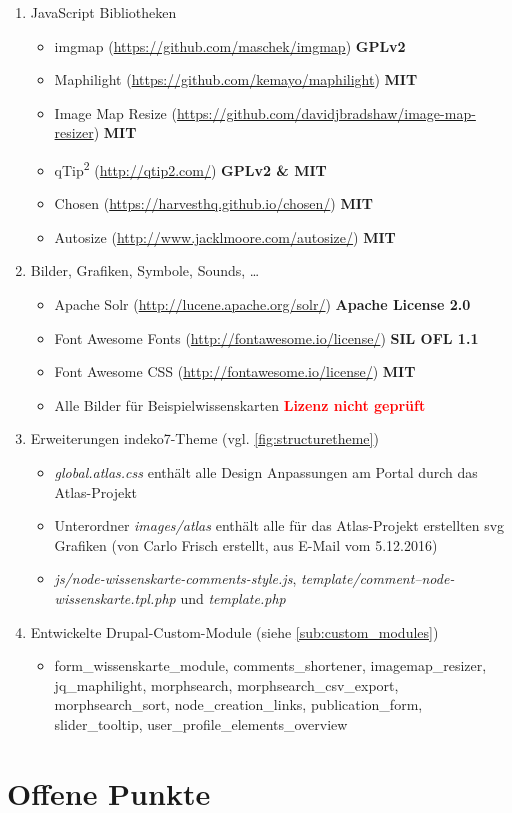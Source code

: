 \begin{enumerate}
	\item JavaScript Bibliotheken
	\begin{itemize}
		\item imgmap (\url{https://github.com/maschek/imgmap})  \textbf{GPLv2}
		\item Maphilight (\url{https://github.com/kemayo/maphilight}) \textbf{MIT}
		\item Image Map Resize (\url{https://github.com/davidjbradshaw/image-map-resizer}) \textbf{MIT}
		\item qTip\textsuperscript{2} (\url{http://qtip2.com/}) \textbf{GPLv2 \& MIT}
		\item Chosen (\url{https://harvesthq.github.io/chosen/}) \textbf{MIT}
		\item Autosize (\url{http://www.jacklmoore.com/autosize/}) \textbf{MIT}
	\end{itemize}

	\item Bilder, Grafiken, Symbole, Sounds, \dots\label{sub:license_images}
	\begin{itemize}
		\item Apache Solr (\url{http://lucene.apache.org/solr/}) \textbf{Apache License 2.0}
		\item Font Awesome Fonts (\url{http://fontawesome.io/license/}) \textbf{SIL OFL 1.1}
		\item Font Awesome CSS (\url{http://fontawesome.io/license/}) \textbf{MIT}
		\item Alle Bilder für Beispielwissenskarten \textcolor{red}{\textbf{Lizenz nicht geprüft}}
	\end{itemize}

	\item Erweiterungen indeko7-Theme (vgl. \cref{fig:structuretheme})
	\begin{itemize}
		\item \textit{global.atlas.css} enthält alle Design Anpassungen am Portal durch das Atlas-Projekt
		\item Unterordner \textit{images/atlas} enthält alle für das Atlas-Projekt erstellten svg Grafiken (von Carlo Frisch erstellt, aus E-Mail vom 5.12.2016)
		\item \textit{js/node-wissenskarte-comments-style.js}, \textit{template/comment--node-wissenskarte.tpl.php} und \textit{template.php}
	\end{itemize}

	\item Entwickelte Drupal-Custom-Module (siehe \cref{sub:custom_modules})
	\begin{itemize}
		\item form\_wissenskarte\_module, comments\_shortener, imagemap\_resizer, jq\_maphilight, morphsearch, morphsearch\_csv\_export, morphsearch\_sort, node\_creation\_links, publication\_form, slider\_tooltip, user\_profile\_elements\_overview
	\end{itemize}
\end{enumerate}


\section{Offene Punkte}


\glsaddall
\printglossary[type=\acronymtype,title = Abkürzungsverzeichnis]

\printglossary

%

